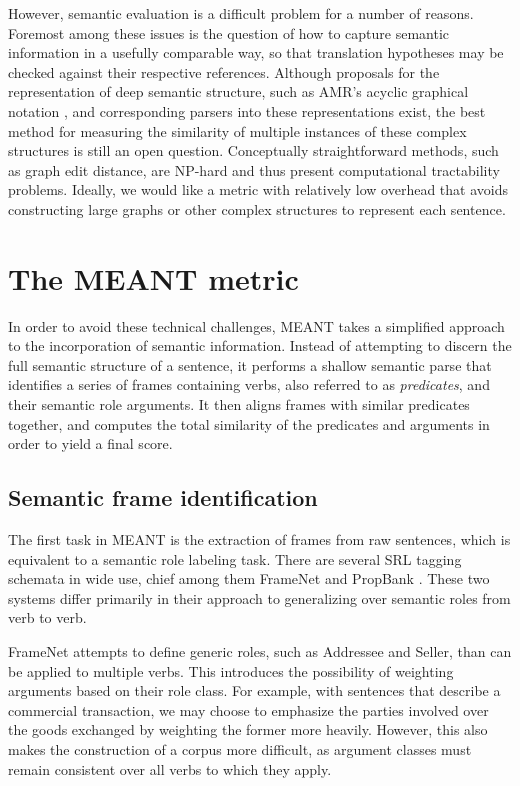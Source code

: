 \documentclass[11pt,twocolumn]{article}
\begin{document}
However, semantic evaluation is a difficult problem for a number of
reasons.
Foremost among these issues is the question of how to capture semantic
information in a usefully comparable way, so that translation hypotheses
may be checked against their respective references.
Although proposals for the representation of deep semantic structure,
such as AMR's acyclic graphical notation \cite{Banarescu:2013}, and
corresponding parsers into these representations \cite{Flanigan:2014}
exist, the best method for measuring the similarity of multiple
instances of these complex structures is still an open question.
Conceptually straightforward methods, such as graph edit distance, are
NP-hard and thus present computational tractability problems.
Ideally, we would like a metric with relatively low overhead that
avoids constructing large graphs or other complex structures to
represent each sentence.


\section{The MEANT metric}

In order to avoid these technical challenges, MEANT takes a simplified
approach to the incorporation of semantic information.
Instead of attempting to discern the full semantic structure of a
sentence, it performs a shallow semantic parse that identifies a series
of frames containing verbs, also referred to as \textit{predicates}, and
their semantic role arguments.
It then aligns frames with similar predicates together, and computes
the total similarity of the predicates and arguments in order to yield
a final score.


\subsection{Semantic frame identification}

The first task in MEANT is the extraction of frames from raw sentences,
which is equivalent to a semantic role labeling task.
There are several SRL tagging schemata in wide use, chief among them
FrameNet \cite{Fillmore:2003} and PropBank \cite{Palmer:2005}.
These two systems differ primarily in their approach to generalizing
over semantic roles from verb to verb.

FrameNet attempts to define generic roles, such as \textsf{Addressee}
and \textsf{Seller}, than can be applied to multiple verbs.
This introduces the possibility of weighting arguments based on their
role class.
For example, with sentences that describe a commercial transaction, we
may choose to emphasize the parties involved over the goods exchanged by
weighting the former more heavily.
However, this also makes the construction of a corpus more difficult,
as argument classes must remain consistent over all verbs to which they
apply.
\end{document}
